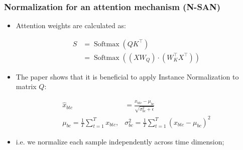 \documentclass[handout, 10pt]{beamer}
\begin{document}
\begin{frame}
    \frametitle{Normalization for an attention mechanism (N-SAN)}
    \begin{itemize}
        \item Attention weights are calculated as:
        
\begin{equation}
\begin{aligned}
S &=\operatorname{Softmax}\left(Q K^{\top}\right) \\
&=\operatorname{Softmax}\left(\left(X W_{Q}\right) \cdot\left(W_{K}^{\top} X^{\top}\right)\right)
\end{aligned}
\end{equation}
        
        \item The paper shows that it is beneficial to apply Instance Normalization to matrix $Q$:

\begin{equation}
\begin{aligned}
\hat{x}_{b t c} &=\frac{x_{b t c}-\mu_{b c}}{\sqrt{\sigma_{b c}^{2}+\epsilon}} \\
\mu_{b c}=\frac{1}{T} \sum_{t=1}^{T} x_{b t c}, & \sigma_{b c}^{2}=\frac{1}{T} \sum_{t=1}^{T}\left(x_{b t c}-\mu_{b c}\right)^{2}
\end{aligned}
\end{equation}

    \item i.e. we normalize each sample independently across time dimension;
    \end{itemize}
\end{frame}
\end{document}
